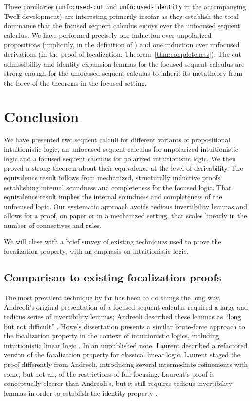 \documentclass[acmtocl]{robtrans}\pdfoutput=1
\begin{document}
These corollaries ({\tt unfocused-cut} and {\tt unfocused-identity} 
in the accompanying Twelf development) 
are interesting primarily insofar as they establish the 
total dominance that the focused sequent calculus enjoys over 
the unfocused sequent calculus. We have performed precisely
one induction over unpolarized propositions
(implicitly, in the definition of 
) and one induction over unfocused derivations (in the proof of
focalization, Theorem~\ref{thm:completeness}). 
The cut admissibility and identity
expansion lemmas for the focused sequent calculus are strong enough for the
unfocused sequent calculus to inherit its metatheory from the force
of the theorems in the focused setting.

\section{Conclusion}
\label{sec:previous}

We have presented two sequent calculi for different variants of
propositional intuitionistic logic, an unfocused sequent calculus for
unpolarized intuitionistic logic and a focused sequent calculus for
polarized intuitionistic logic.  We then proved a strong theorem about
their equivalence at the level of derivability. The equivalence result
follows from mechanized, structurally inductive proofs establishing
internal soundness and completeness for the focused logic. That
equivalence result implies the internal soundness and completeness of
the unfocused logic. Our systematic approach avoids
tedious invertibility lemmas and allows for a proof, on paper or 
in a mechanized setting, that scales linearly in the number of
connectives and rules.

We will close with a brief survey of existing techniques used to prove
the focalization property, with an emphasis on intuitionistic logic.

\subsection{Comparison to existing focalization proofs}

The most prevalent technique by far has been to do things the long
way.  Andreoli's original presentation of a focused sequent calculus
required a large and tedious series of invertibility lemmas; Andreoli
described these lemmas as ``long but not difficult''
\cite{andreoli92logic}.  Howe's dissertation presents a similar
brute-force approach to the focalization property in the context of
intuitionistic logics, including intuitionistic linear logic
\cite{howe98proof}.  In an unpublished note, Laurent described a
refactored version of the focalization property for classical linear
logic. Laurent staged the proof differently from Andreoli, introducing
several intermediate refinements with some, but not all, of the
restrictions of full focusing.  Laurent's proof is conceptually
clearer than Andreoli's, but it still requires tedious invertibility
lemmas in order to establish the identity property
\cite{laurent04proof}.
\end{document}
